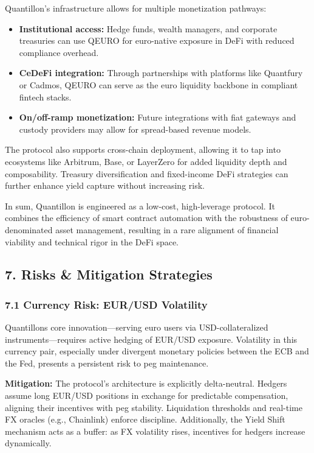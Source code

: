 Quantillon's infrastructure allows for multiple monetization pathways:

\begin{itemize}
\item
  \textbf{Institutional access:} Hedge funds, wealth managers, and
  corporate treasuries can use QEURO for euro-native exposure in DeFi
  with reduced compliance overhead.
\item
  \textbf{CeDeFi integration:} Through partnerships with platforms like
  Quantfury or Cadmos, QEURO can serve as the euro liquidity backbone in
  compliant fintech stacks.
\item
  \textbf{On/off-ramp monetization:} Future integrations with fiat
  gateways and custody providers may allow for spread-based revenue
  models.
\end{itemize}

The protocol also supports cross-chain deployment, allowing it to tap
into ecosystems like Arbitrum, Base, or LayerZero for added liquidity
depth and composability. Treasury diversification and fixed-income DeFi
strategies can further enhance yield capture without increasing risk.

In sum, Quantillon is engineered as a low-cost, high-leverage protocol.
It combines the efficiency of smart contract automation with the
robustness of euro-denominated asset management, resulting in a rare
alignment of financial viability and technical rigor in the DeFi space.

\hypertarget{risks-mitigation-strategies}{%
\subsection{7. Risks \& Mitigation
Strategies}\label{risks-mitigation-strategies}}

\hypertarget{currency-risk-eurusd-volatility}{%
\subsubsection{7.1 Currency Risk: EUR/USD
Volatility}\label{currency-risk-eurusd-volatility}}

Quantillon\textquotesingle s core innovation---serving euro users via
USD-collateralized instruments---requires active hedging of EUR/USD
exposure. Volatility in this currency pair, especially under divergent
monetary policies between the ECB and the Fed, presents a persistent
risk to peg maintenance.

\textbf{Mitigation:} The protocol's architecture is explicitly
delta-neutral. Hedgers assume long EUR/USD positions in exchange for
predictable compensation, aligning their incentives with peg stability.
Liquidation thresholds and real-time FX oracles (e.g., Chainlink)
enforce discipline. Additionally, the Yield Shift mechanism acts as a
buffer: as FX volatility rises, incentives for hedgers increase
dynamically.

